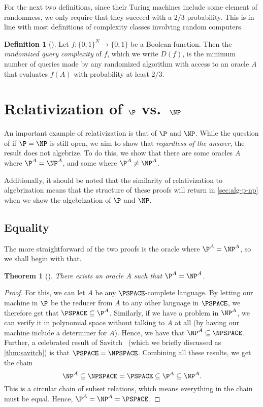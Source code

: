 \documentclass[english,12pt]{reedthesis}
\theoremstyle{plain}
\newtheorem{thm}{Theorem}[section]
\theoremstyle{definition}
\newtheorem{defn}[defn]{Definition}
\theoremstyle{remark}
\begin{document}
For the next two definitions, since their Turing machines include some element
of randomness, we only require that they succeed with a $2/3$ probability. This
is in line with most definitions of complexity classes involving random
computers.

\begin{defn}[{\cite[17]{AW09}}]\label{def:rand-qc}
  Let $f\colon \{0, 1\}^{N} \rightarrow \{0, 1\}$ be a Boolean function. Then the
  \emph{randomized query complexity} of $f$, which we write $D(f)$, is the
  minimum number of queries made by any randomized algorithm with access to an
  oracle $A$ that evaluates $f(A)$ with probability at least $2/3$.
\end{defn}

\section{Relativization of $\P$ vs.\ $\NP$}\label{sec:rel-p-np}

An important example of relativization is that of $\P$ and $\NP$. While the
question of if $\P = \NP$ is still open, we aim to show that \emph{regardless of
the answer}, the result does not algebrize. To do this, we show that there are
some oracles $A$ where $\P^{A} = \NP^{A}$, and some where $\P^{A} \ne \NP^{A}$.

Additionally, it should be noted that the similarity of relativization to
algebrization means that the structure of these proofs will return in
\cref{sec:alg-p-np} when we show the algebrization of $\P$ and $\NP$.

\subsection{Equality}

The more straightforward of the two proofs is the oracle where
$\P^{A} = \NP^{A}$, so we shall begin with that.

\begin{thm}[{\cite[Theorem 2]{BGS75}}]\label{thm:p-np-rel}
  There exists an oracle $A$ such that $\P^{A} = \NP^{A}$.
\end{thm}

\begin{proof}
  For this, we can let $A$ be any $\PSPACE$-complete language. By letting our
  machine in $\P$ be the reducer from $A$ to any other language in $\PSPACE$, we
  therefore get that $\PSPACE \subseteq \P^{A}$. Similarly, if we have a problem in
  $\NP^{A}$, we can verify it in polynomial space without talking to $A$ at all
  (by having our machine include a determiner for $A$). Hence, we have that
  $\NP^{A} \subseteq \NPSPACE$. Further, a celebrated result of Savitch~\cite{Sav70}
  (which we briefly discussed as \cref{thm:savitch}) is that
  $\PSPACE = \NPSPACE$. Combining all these results, we get the chain
  \begin{equation}
    \NP^{A} \subseteq \NPSPACE = \PSPACE \subseteq \P^{A} \subseteq \NP^{A}.
  \end{equation}
  This is a circular chain of subset relations, which means everything in the
  chain must be equal. Hence, $\P^{A} = \NP^{A} = \PSPACE$.
\end{proof}
\end{document}

